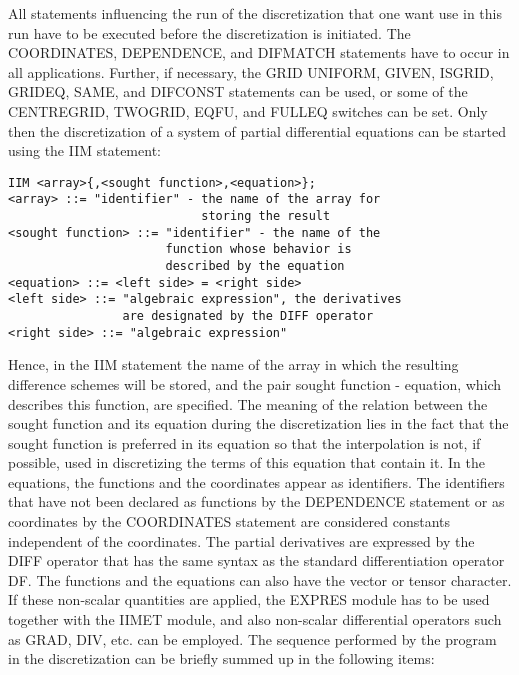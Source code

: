      All statements influencing the run of  the discretization  that one
want use  in this  run have  to be executed before the discretization is
initiated. The COORDINATES, DEPENDENCE, and DIFMATCH  statements have to
occur  in  all  applications.  Further,  if necessary, the GRID UNIFORM,
GIVEN, ISGRID,  GRIDEQ, SAME,  and DIFCONST  statements can  be used, or
some of  the CENTREGRID,  TWOGRID, EQFU, and FULLEQ switches can be set.
Only  then  the  discretization  of  a  system  of  partial differential
equations can be started using the IIM statement:
\begin{verbatim}
IIM <array>{,<sought function>,<equation>};
<array> ::= "identifier" - the name of the array for
                           storing the result
<sought function> ::= "identifier" - the name of the
                      function whose behavior is
                      described by the equation
<equation> ::= <left side> = <right side>
<left side> ::= "algebraic expression", the derivatives
                are designated by the DIFF operator
<right side> ::= "algebraic expression"
\end{verbatim}
Hence, in the IIM statement the name of the array in which the resulting
difference schemes will  be  stored,  and  the  pair  sought  function -
equation, which  describes this  function, are specified. The meaning of
the relation  between the  sought function  and its  equation during the
discretization lies in the fact that the sought function is preferred in
its equation so that the interpolation  is  not,  if  possible,  used in
discretizing  the  terms  of  this  equation  that  contain  it.  In the
equations, the functions and the coordinates appear as  identifiers. The
identifiers that  have not  been declared as functions by the DEPENDENCE
statement or as coordinates by the COORDINATES statement  are considered
constants independent  of the  coordinates. The  partial derivatives are
expressed by the DIFF operator that has the same syntax  as the standard
differentiation operator  DF.   The functions and the equations can also
have the vector or tensor character. If these  non-scalar quantities are
applied,  the  EXPRES  module  has  to  be  used together with the IIMET
module, and also non-scalar  differential operators  such as  GRAD, DIV,
etc. can be employed.
     The sequence  performed by the program in the discretization can be
briefly summed up in the following items:
